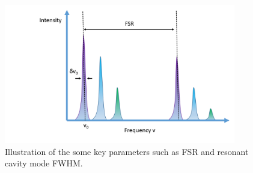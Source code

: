 \begin{figure}[h]
	\centering
	\includegraphics[width=0.9\textwidth]{Figs/Ch1/modes.png}
	\caption {Illustration of the some key parameters such as FSR and resonant cavity mode FWHM. }
	\label{1.12}
\end{figure}
\FloatBarrier 


